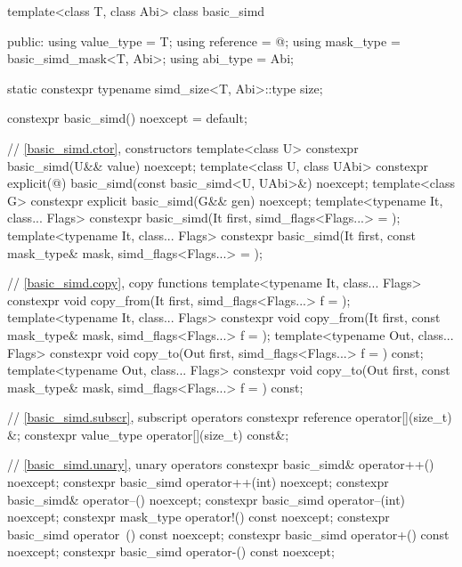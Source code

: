 \begin{codeblock}
template<class T, class Abi> class basic_simd {
public:
  using value_type = T;
  using reference = @\seebelow@;
  using mask_type = basic_simd_mask<T, Abi>;
  using abi_type = Abi;

  static constexpr typename simd_size<T, Abi>::type size;

  constexpr basic_simd() noexcept = default;

  // \ref{basic_simd.ctor},  constructors
  template<class U> constexpr basic_simd(U&& value) noexcept;
  template<class U, class UAbi>
    constexpr explicit(@\seebelow@) basic_simd(const basic_simd<U, UAbi>&) noexcept;
  template<class G> constexpr explicit basic_simd(G&& gen) noexcept;
  template<typename It, class... Flags>
    constexpr basic_simd(It first, simd_flags<Flags...> = {});
  template<typename It, class... Flags>
    constexpr basic_simd(It first, const mask_type& mask, simd_flags<Flags...> = {});

  // \ref{basic_simd.copy},  copy functions
  template<typename It, class... Flags>
    constexpr void copy_from(It first, simd_flags<Flags...> f = {});
  template<typename It, class... Flags>
    constexpr void copy_from(It first, const mask_type& mask, simd_flags<Flags...> f = {});
  template<typename Out, class... Flags>
    constexpr void copy_to(Out first, simd_flags<Flags...> f = {}) const;
  template<typename Out, class... Flags>
    constexpr void copy_to(Out first, const mask_type& mask, simd_flags<Flags...> f = {}) const;

  // \ref{basic_simd.subscr},  subscript operators
  constexpr reference operator[](size_t) &;
  constexpr value_type operator[](size_t) const&;

  // \ref{basic_simd.unary},  unary operators
  constexpr basic_simd& operator++() noexcept;
  constexpr basic_simd operator++(int) noexcept;
  constexpr basic_simd& operator--() noexcept;
  constexpr basic_simd operator--(int) noexcept;
  constexpr mask_type operator!() const noexcept;
  constexpr basic_simd operator~() const noexcept;
  constexpr basic_simd operator+() const noexcept;
  constexpr basic_simd operator-() const noexcept;

}
\end{codeblock}
